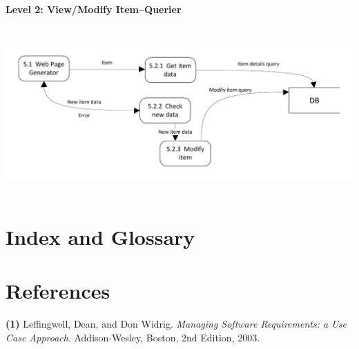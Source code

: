 \documentclass{article}
\begin{document}
\paragraph{Level 2: View/Modify Item--Querier}
~\\
\includegraphics[keepaspectratio, width=6.5in]{dfd_level2_view_modify_item_querier.pdf}\\
~\\

\section{Index and Glossary}

\section{References}
\hangindent=1.4cm
\textbf{(1)} Leffingwell, Dean, and Don Widrig.
\emph{Managing Software Requirements: a Use Case Approach}.
Addison-Wesley, Boston,
2nd Edition,
2003.
\end{document}
